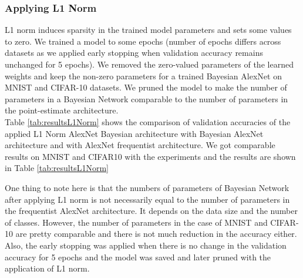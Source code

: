 \subsubsection{Applying L1 Norm}


L1 norm induces sparsity in the trained model parameters and sets some values to zero. We trained a model to some epochs (number of epochs differs across datasets as we applied early stopping when validation accuracy remains unchanged for 5 epochs). We removed the zero-valued parameters of the learned weights and keep the non-zero parameters for a trained Bayesian AlexNet on MNIST and CIFAR-10 datasets. We pruned the model to make the number of parameters in a Bayesian Network comparable to the number of parameters in the point-estimate architecture. \\ Table \ref{tab:resultsL1Norm} shows the comparison of validation accuracies of the applied L1 Norm AlexNet Bayesian architecture with Bayesian AlexNet architecture and with AlexNet frequentist architecture. We got comparable results on MNIST and CIFAR10 with the experiments and the results are shown in Table \ref{tab:resultsL1Norm}

\begin{table}[H]
\tiny
    \centering
    \renewcommand{\arraystretch}{1.5}
    \renewcommand{\arraystretch}{1.5}
    \caption{Comparison of validation accuracies (in percentage) for AlexNet with variational inference (VI), AlexNet with frequentist inference and BayesianAlexNet with L1 norm applied for MNIST and CIFAR-10 datasets.}
    \label{tab:resultsL1Norm}
\end{table}

One thing to note here is that the numbers of parameters of Bayesian Network after applying L1 norm is not necessarily equal to the number of parameters in the frequentist AlexNet architecture. It depends on the data size and the number of classes. However, the number of parameters in the case of MNIST and CIFAR-10 are pretty comparable and there is not much reduction in the accuracy either. Also, the early stopping was applied when there is no change in the validation accuracy for 5 epochs and the model was saved and later pruned with the application of L1 norm.

